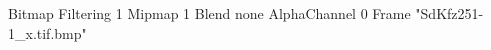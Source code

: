 {Bitmap
	{Filtering 1}
	{Mipmap 1}
	{Blend none}
	{AlphaChannel 0}
	{Frame "SdKfz251-1_x.tif.bmp"}
}
